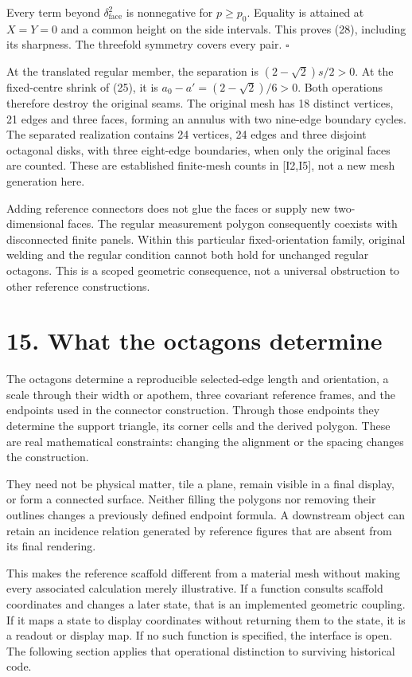 \documentclass[
  11pt,
  a4paper,
]{article}
\begin{document}
Every term beyond \(\delta_{\mathrm{face}}^2\) is nonnegative for \(p\ge p_0\). Equality is attained at \(X=Y=0\) and a common height on the side intervals. This proves (28), including its sharpness. The threefold symmetry covers every pair. \(\square\)

At the translated regular member, the separation is \((2-\sqrt2)s/2>0\). At the fixed-centre shrink of (25), it is \(a_0-a'=(2-\sqrt2)/6>0\). Both operations therefore destroy the original seams. The original mesh has 18 distinct vertices, 21 edges and three faces, forming an annulus with two nine-edge boundary cycles. The separated realization contains 24 vertices, 24 edges and three disjoint octagonal disks, with three eight-edge boundaries, when only the original faces are counted. These are established finite-mesh counts in {[}I2,I5{]}, not a new mesh generation here.

Adding reference connectors does not glue the faces or supply new two-dimensional faces. The regular measurement polygon consequently coexists with disconnected finite panels. Within this particular fixed-orientation family, original welding and the regular condition cannot both hold for unchanged regular octagons. This is a scoped geometric consequence, not a universal obstruction to other reference constructions.

\section{15. What the octagons determine}\label{what-the-octagons-determine}

The octagons determine a reproducible selected-edge length and orientation, a scale through their width or apothem, three covariant reference frames, and the endpoints used in the connector construction. Through those endpoints they determine the support triangle, its corner cells and the derived polygon. These are real mathematical constraints: changing the alignment or the spacing changes the construction.

They need not be physical matter, tile a plane, remain visible in a final display, or form a connected surface. Neither filling the polygons nor removing their outlines changes a previously defined endpoint formula. A downstream object can retain an incidence relation generated by reference figures that are absent from its final rendering.

This makes the reference scaffold different from a material mesh without making every associated calculation merely illustrative. If a function consults scaffold coordinates and changes a later state, that is an implemented geometric coupling. If it maps a state to display coordinates without returning them to the state, it is a readout or display map. If no such function is specified, the interface is open. The following section applies that operational distinction to surviving historical code.
\end{document}
